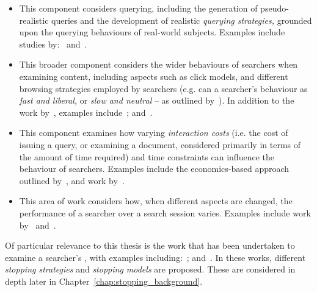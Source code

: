 \begin{itemize}
    \item{ This component considers querying, including the generation of pseudo-realistic queries and the development of realistic \emph{querying strategies,} grounded upon the querying behaviours of real-world subjects. Examples include studies by:~\cite{azzopardi2009query_side, azzopardi2007languages, carterette2015test_collections, jordan2006cqg, keskustalo2009querying} and~\cite{verberne2015personalised_queries}.}
    
    \item{ This broader component considers the wider behaviours of searchers when examining content, including aspects such as click models, and different browsing strategies employed by searchers (e.g. can a searcher's behaviour as \emph{fast and liberal,} or \emph{slow and neutral} -- as outlined by~\cite{smucker2011user_strategies}). In addition to the work by~\cite{smucker2011user_strategies}, examples include~\cite{carterette2015test_collections, chuklin2015click_models, guo2009click_chain}; and~\cite{pakkonen2015behavioural_dimensions}.}
    
    \item{ This component examines how varying \emph{interaction costs} (i.e. the cost of issuing a query, or examining a document, considered primarily in terms of the amount of time required) and time constraints can influence the behaviour of searchers. Examples include the economics-based approach outlined by~\cite{azzopardi2011economics}, and work by~\cite{baskaya2012simulating_sessions}.}
    
    \item{ This area of work considers how, when different aspects are changed, the performance of a searcher over a search session varies. Examples include work by~\cite{luo2014winwin} and~\cite{luo2015pomdp}.}
\end{itemize}

Of particular relevance to this thesis is the work that has been undertaken to examine a searcher's , with examples including:~\cite{carterette2011models, carterette2015test_collections, maxwell2015initial_stopping, maxwell2015stopping_strategies}; and~\cite{thomas2014modelling_behaviour}. In these works, different \emph{stopping strategies} and \emph{stopping models} are proposed. These are considered in depth later in Chapter~\ref{chap:stopping_background}.

